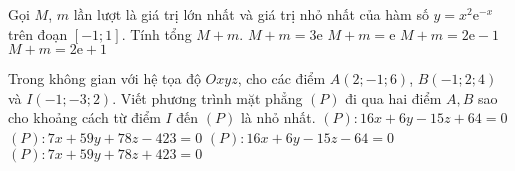 \begin{ex}%
	Gọi $M$, $m$ lần lượt là giá trị lớn nhất và giá trị nhỏ nhất của hàm số $y=x^2 \mathrm{e}^{-x}$ trên đoạn $\left[ {-1;1} \right]$. Tính tổng $M+m$.
	\choice
	{$M+m=3\mathrm{e}$}
	{\True $M+m=\mathrm{e}$}
	{$M+m=2\mathrm{e}-1$}
	{$M+m=2\mathrm{e}+1$}
\end{ex}

\begin{ex}%
	Trong không gian với hệ tọa độ $Oxyz$, cho các điểm $A(2;-1;6)$, $B(-1;2;4)$ và $I(-1;-3;2)$. Viết phương trình mặt phẳng $(P)$ đi qua hai điểm $A, B$ sao cho khoảng cách từ điểm $I$ đến $(P)$ là nhỏ nhất.
	\choice
	{\True $(P):16x+6y-15z+64=0$}
	{$(P):7x+59y+78z-423=0$}
	{$(P):16x+6y-15z-64=0$}
	{$(P):7x+59y+78z+423=0$}
\end{ex}

